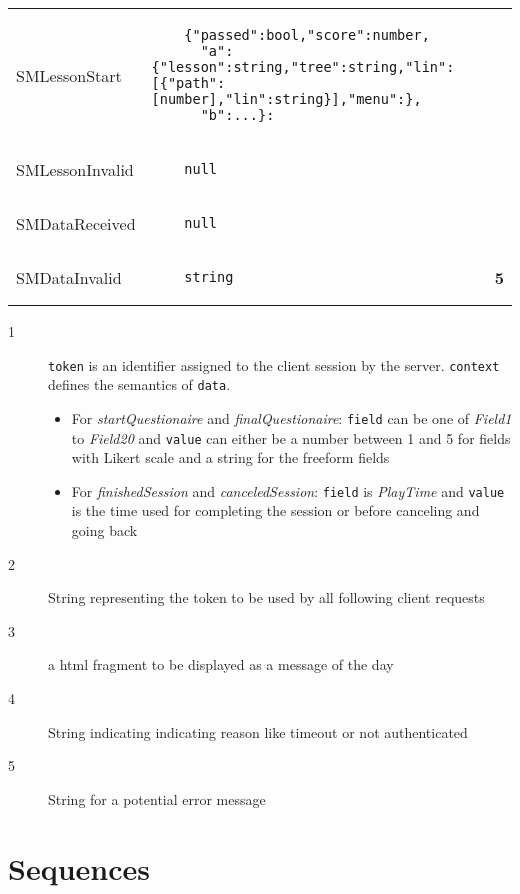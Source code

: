 \documentclass{scrartcl}
\begin{document}
\begin{tabular}{lll}
  SMLessonStart &
  \begin{lstlisting}
    {"passed":bool,"score":number,
      "a":{"lesson":string,"tree":string,"lin":[{"path":[number],"lin":string}],"menu":},
      "b":...}:
  \end{lstlisting} \\
  SMLessonInvalid &
  \begin{lstlisting}
    null
  \end{lstlisting} \\
  SMDataReceived &
  \begin{lstlisting}
    null
  \end{lstlisting} \\
  SMDataInvalid &
  \begin{lstlisting}
    string
  \end{lstlisting} & {\bfseries\footnotesize 5} \\
\end{tabular}

\begin{description}
\item[{\footnotesize 1}] \texttt{token} is an identifier assigned to the client session by the server. \texttt{context} defines the semantics of \texttt{data}.

  \begin{itemize}
  \item For \emph{startQuestionaire} and \emph{finalQuestionaire}: \texttt{field} can be one of \emph{Field1} to \emph{Field20} and \texttt{value} can either be a number between 1 and 5 for fields with Likert scale and a string for the freeform fields
  \item For \emph{finishedSession} and \emph{canceledSession}: \texttt{field} is \emph{PlayTime} and \texttt{value} is the time used for completing the session or before canceling and going back
  \end{itemize}
\item[{\footnotesize 2}] String representing the token to be used by all following client requests
\item[{\footnotesize 3}] a html fragment to be displayed as a message of the day
\item[{\footnotesize 4}] String indicating indicating reason like timeout or not authenticated
\item[{\footnotesize 5}] String for a potential error message
\end{description}
\section{Sequences}
\end{document}
